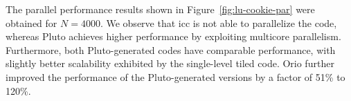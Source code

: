 The parallel performance results shown in Figure~\ref{fig:lu-cookie-par} were
obtained for $N=4000$. We observe that icc is not able to parallelize the
code, whereas Pluto achieves higher performance by exploiting multicore
parallelism. Furthermore, both Pluto-generated codes have comparable
performance, with slightly better scalability exhibited by the single-level tiled
code. Orio further improved the performance of the Pluto-generated versions
by a factor of 51\% to 120\%.
 
